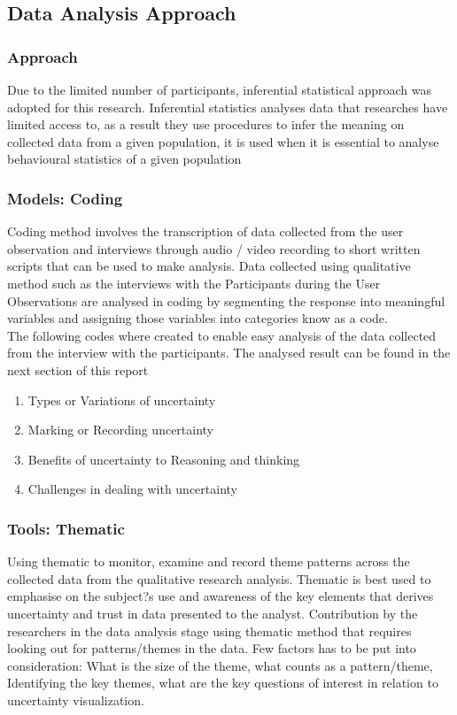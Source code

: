\documentclass[journal]{vgtc}                %
\begin{document}
\subsection{Data Analysis Approach}
\subsubsection{Approach}
Due to the limited number of participants, inferential statistical approach was adopted for this research. Inferential statistics analyses data that researches have limited access to, as a result they use procedures to infer the meaning on collected data from a given population, it is used when it is essential to analyse behavioural statistics of a given population

\subsubsection{Models: Coding}
Coding method involves the transcription of data collected from the user observation and interviews through audio / video recording to short written scripts that can be used to make analysis. Data collected using qualitative method such as the interviews with the Participants during the User Observations are analysed in coding by segmenting the response into meaningful variables and assigning those variables into categories know as a code.\\

The following codes where created to enable easy analysis of the data collected from the interview with the participants. The analysed result can be found in the next section of this report

\begin{enumerate}
  \item Types or Variations of uncertainty
  \item Marking or Recording uncertainty
  \item Benefits of uncertainty to Reasoning and thinking
  \item Challenges in dealing with uncertainty
\end{enumerate}

\subsubsection{Tools: Thematic}
Using thematic to monitor, examine and record theme patterns across the collected data from the qualitative research analysis.
Thematic is best used to emphasise on the subject?s use and awareness of the key elements that derives uncertainty and trust in data presented to the analyst.
Contribution by the researchers in the data analysis stage using thematic method that requires looking out for patterns/themes in the data. Few factors has to be put into consideration: What is the size of the theme, what counts as a pattern/theme, Identifying the key themes, what are the key questions of interest in relation to uncertainty visualization.
\end{document}
